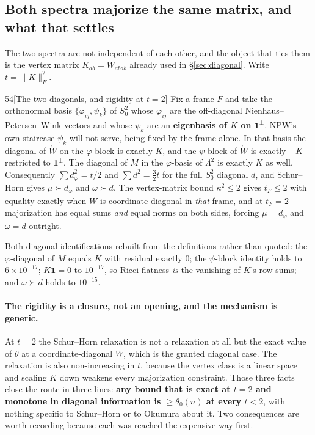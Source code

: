 \subsection{Both spectra majorize the same matrix, and what that settles}\label{sec:schurhorn}

The two spectra are not independent of each other, and the object that ties them is the vertex matrix $K_{ab}=W_{abab}$ already used in \S\ref{sec:diagonal}. Write $t=\|K\|_F^2$.

\begin{Lem}{54}[The two diagonals, and rigidity at $t=2$]
Fix a frame $F$ and take the orthonormal basis $\{\varphi_{ij},\psi_k\}$ of $S^2_0$ whose $\varphi_{ij}$ are the off-diagonal Nienhaus--Petersen--Wink vectors and whose $\psi_k$ are an \textbf{eigenbasis of $K$ on $\mathbf1^{\perp}$}. NPW's own staircase $\psi_k$ will not serve, being fixed by the frame alone. In that basis the diagonal of $\mathring W$ on the $\varphi$-block is exactly $K$, and the $\psi$-block of $\mathring W$ is exactly $-K$ restricted to $\mathbf1^{\perp}$. The diagonal of $M$ in the $\varphi$-basis of $\Lambda^2$ is exactly $K$ as well. Consequently $\sum d_\varphi^2=t/2$ and $\sum d^2=\tfrac32t$ for the full $S^2_0$ diagonal $d$, and Schur--Horn gives $\mu\succ d_\varphi$ and $\omega\succ d$. The vertex-matrix bound $\kappa^2\le2$ gives $t_F\le2$ with equality exactly when $W$ is coordinate-diagonal in \emph{that} frame, and at $t_F=2$ majorization has equal sums \emph{and} equal norms on both sides, forcing $\mu=d_\varphi$ and $\omega=d$ outright.
\end{Lem}

\begin{certificate}
Both diagonal identifications rebuilt from the definitions rather than quoted: the $\varphi$-diagonal of $M$ equals $K$ with residual exactly $0$; the $\psi$-block identity holds to $6\times10^{-17}$; $K\mathbf1=0$ to $10^{-17}$, so Ricci-flatness \emph{is} the vanishing of $K$'s row sums; and $\omega\succ d$ holds to $10^{-15}$.
\end{certificate}

\paragraph{The rigidity is a closure, not an opening, and the mechanism is generic.} At $t=2$ the Schur--Horn relaxation is not a relaxation at all but the exact value of $\theta$ at a coordinate-diagonal $W$, which is the granted diagonal case. The relaxation is also non-increasing in $t$, because the vertex class is a linear space and scaling $K$ down weakens every majorization constraint. Those three facts close the route in three lines: \textbf{any bound that is exact at $t=2$ and monotone in diagonal information is $\ge\theta_0(n)$ at every $t<2$}, with nothing specific to Schur--Horn or to Okumura about it. Two consequences are worth recording because each was reached the expensive way first.

